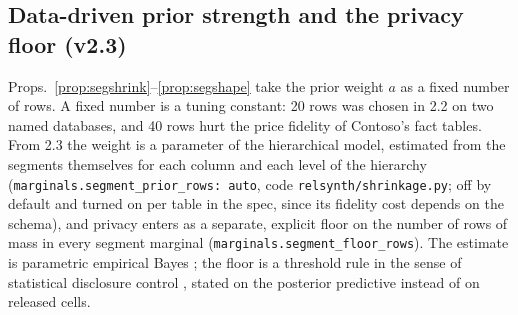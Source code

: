 \subsection*{Data-driven prior strength and the privacy floor (v2.3)}
Props.~\ref{prop:segshrink}--\ref{prop:segshape} take the prior weight $a$ as a fixed number of rows. A fixed number is a tuning constant: 20 rows was chosen in 2.2 on two named databases, and 40 rows hurt the price fidelity of Contoso's fact tables. From 2.3 the weight is a parameter of the hierarchical model, estimated from the segments themselves for each column and each level of the hierarchy (\texttt{marginals.segment\_prior\_rows: auto}, code \texttt{relsynth/shrinkage.py}; off by default and turned on per table in the spec, since its fidelity cost depends on the schema), and privacy enters as a separate, explicit floor on the number of rows of mass in every segment marginal (\texttt{marginals.segment\_floor\_rows}). The estimate is parametric empirical Bayes \cite{efronmorris1975,morris1983}; the floor is a threshold rule in the sense of statistical disclosure control \cite{hundepool2012}, stated on the posterior predictive instead of on released cells.

